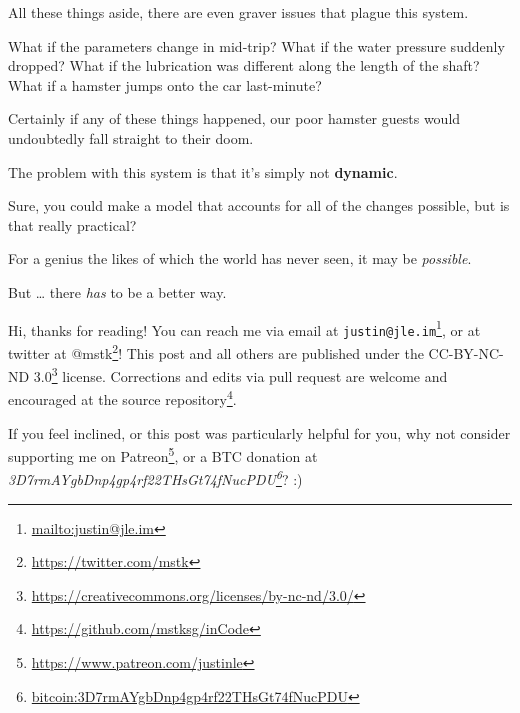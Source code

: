 \documentclass[]{article}
\renewcommand{\href}[2]{#2\footnote{\url{#1}}}
\begin{document}
All these things aside, there are even graver issues that plague this system.

What if the parameters change in mid-trip? What if the water pressure suddenly
dropped? What if the lubrication was different along the length of the shaft?
What if a hamster jumps onto the car last-minute?

Certainly if any of these things happened, our poor hamster guests would
undoubtedly fall straight to their doom.

The problem with this system is that it's simply not \textbf{dynamic}.

Sure, you could make a model that accounts for all of the changes possible, but
is that really practical?

For a genius the likes of which the world has never seen, it may be
\emph{possible}.

But \ldots{} there \emph{has} to be a better way.

Hi, thanks for reading! You can reach me via email at
\href{mailto:justin@jle.im}{\nolinkurl{justin@jle.im}}, or at twitter at
\href{https://twitter.com/mstk}{@mstk}! This post and all others are published
under the \href{https://creativecommons.org/licenses/by-nc-nd/3.0/}{CC-BY-NC-ND
3.0} license. Corrections and edits via pull request are welcome and encouraged
at \href{https://github.com/mstksg/inCode}{the source repository}.

If you feel inclined, or this post was particularly helpful for you, why not
consider \href{https://www.patreon.com/justinle}{supporting me on Patreon}, or a
BTC donation at
\emph{\href{bitcoin:3D7rmAYgbDnp4gp4rf22THsGt74fNucPDU}{3D7rmAYgbDnp4gp4rf22THsGt74fNucPDU}}?
:)
\end{document}
